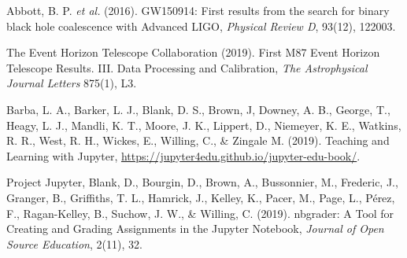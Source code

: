 \documentclass[twocolumn]{svjour3}          %
\begin{document}
\begin{thebibliography}{99}
%
%
Abbott, B. P. \textit{et al.} (2016).
GW150914: First results from the search for binary black hole coalescence with Advanced LIGO,
\textit{Physical Review D}, 93(12), 122003.

The Event Horizon Telescope Collaboration (2019).
First M87 Event Horizon Telescope Results. III. Data Processing and Calibration,
\textit{The Astrophysical Journal Letters} 875(1), L3.

Barba, L. A., Barker, L. J., Blank, D. S., Brown, J, Downey, A. B., George, T.,
Heagy, L. J., Mandli, K. T., Moore, J. K., Lippert, D., Niemeyer, K. E.,
Watkins, R. R., West, R. H., Wickes, E., Willing, C., \& Zingale M. (2019).
Teaching and Learning with Jupyter,
\url{https://jupyter4edu.github.io/jupyter-edu-book/}.

Project Jupyter, Blank, D., Bourgin, D., Brown, A., Bussonnier, M.,
Frederic, J., Granger, B., Griffiths, T. L.,  Hamrick, J., Kelley, K.,
Pacer, M., Page, L., P{\'e}rez, F., Ragan-Kelley, B., Suchow, J. W.,
\& Willing, C. (2019).
nbgrader: A Tool for Creating and Grading Assignments in the Jupyter Notebook,
\textit{Journal of Open Source Education}, 2(11), 32.
\end{thebibliography}
\end{document}
